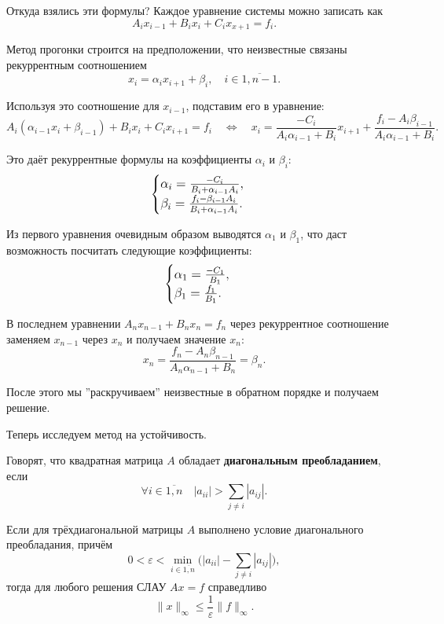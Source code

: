 \documentclass{article}
\begin{document}
Откуда взялись эти формулы? Каждое уравнение системы можно записать как
\[A_ix_{i-1}+B_ix_i+C_ix_{x+1}=f_i.\]

Метод прогонки строится на предположении, что неизвестные связаны
рекуррентным соотношением
\[x_i=\alpha_ix_{i+1}+\beta_i,\quad i\in\overline{1,n-1}.\]

Используя это соотношение для $x_{i-1}$, подставим его в уравнение:
\[A_i(\alpha_{i-1}x_i+\beta_{i-1})+B_ix_i+C_ix_{i+1}=f_i\quad
\Leftrightarrow\quad x_i=\frac{-C_i}{A_i\alpha_{i-1}+B_i}x_{i+1}+
\frac{f_i-A_i\beta_{i-1}}{A_i\alpha_{i-1}+B_i}.\]

Это даёт рекуррентные формулы на коэффициенты $\alpha_i$ и $\beta_i$:
\[
	\mathlarger{
	\begin{cases}
		\alpha_i=\frac{-C_i}{B_i+\alpha_{i-1}A_i}, \\
		\beta_i=\frac{f_i-\beta_{i-1}A_i}{B_i+\alpha_{i-1}A_i}. \\
	\end{cases}
	}
\]

Из первого уравнения очевидным образом выводятся $\alpha_1$ и $\beta_1$,
что даст возможность посчитать следующие коэффициенты:
\[
	\mathlarger{
	\begin{cases}
		\alpha_1=\frac{-C_1}{B_1}, \\
		\beta_1=\frac{f_1}{B_1}. \\
	\end{cases}
	}
\]

В последнем уравнении $A_nx_{n-1}+B_nx_n=f_n$ через рекуррентное соотношение
заменяем $x_{n-1}$ через $x_n$ и получаем значение $x_n$:
\[x_n=\frac{f_n-A_n\beta_{n-1}}{A_n\alpha_{n-1}+B_n}=\beta_n.\]

После этого мы ''раскручиваем'' неизвестные в обратном порядке и получаем
решение.

Теперь исследуем метод на устойчивость.

\begin{define}\label{eq:diagonally_dominant_matrix}
	Говорят, что квадратная матрица $A$ обладает \textbf{диагональным
	преобладанием}, если
	\[\forall i\in\overline{1,n}\quad |a_{ii}|>\sum_{j\ne i}|a_{ij}|.\]
\end{define}

\begin{theorem}
	Если для трёхдиагональной матрицы $A$ выполнено условие диагонального
	преобладания, причём
	\[0<\varepsilon<\min_{i\in\overline{1,n}}\Big(|a_{ii}|-
	\sum_{j\ne i}|a_{ij}|\Big),\]
	тогда для любого решения СЛАУ $Ax=f$ справедливо
	\[\boxed{\|x\|_\infty\le\frac{1}{\varepsilon}
	\|f\|_\infty}.\]
\end{theorem}
\end{document}
